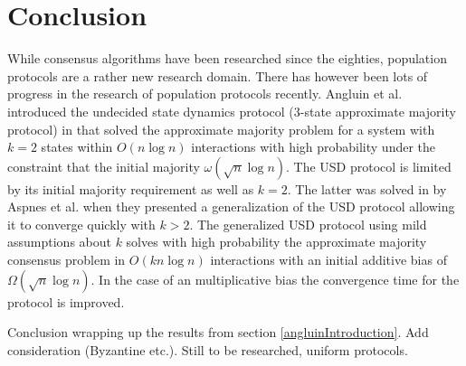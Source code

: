 \section{Conclusion} 
While consensus algorithms have been researched since the eighties, population protocols are a rather new research domain. There has however been lots of progress in the research of population protocols recently. Angluin et al. introduced the undecided state dynamics protocol (3-state approximate majority protocol) in \cite{angluinSimplePopulationProtocol2008} that solved the approximate majority problem for a system with $k = 2$ states within $O(n \log n)$ interactions with high probability under the constraint that the initial majority $\omega(\sqrt{n} \log n)$. The USD protocol is limited by its initial majority requirement as well as $k = 2$. The latter was solved in \cite{AspnesFastConverganceOfKOpinion2023} by Aspnes et al. when they presented a generalization of the USD protocol allowing it to converge quickly with $k > 2$. The generalized USD protocol using mild assumptions about $k$ solves with high probability the approximate majority consensus problem in $O(k n \log n)$ interactions with an initial additive bias of $\Omega(\sqrt{n} \log n)$. In the case of an multiplicative bias the convergence time for the protocol is improved. 


Conclusion wrapping up the results from section \ref{angluinIntroduction}. Add consideration (Byzantine  etc.). 
Still to be researched, uniform protocols. 
